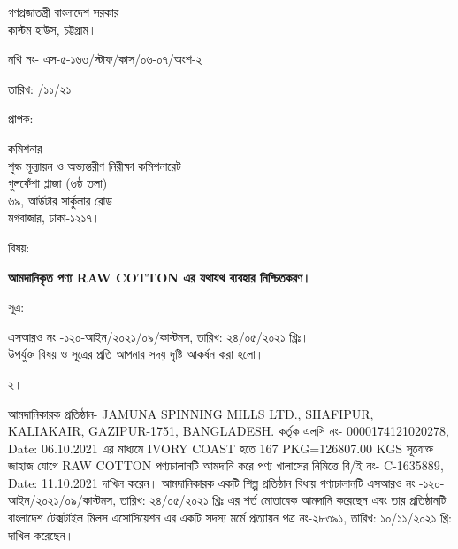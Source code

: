 \documentclass[12pt]{article}
\let\oldhref\href
\renewcommand{\href}[3][blue]{\oldhref{#2}{\color{#1}{#3}}}
\newcommand{\fileno}{নথি নং- এস-৫-১৬৩/স্টাফ/কাস/০৬-০৭/অংশ-২}
\newcommand{\beno}{C-1635889}
\newcommand{\bedt}{11.10.2021}
\newcommand{\co}{IVORY COAST}
\newcommand{\fdt}{\hspace*{3em} তারিখ: \hspace{2.4em} /১১/২১}
\newcommand{\good}{RAW COTTON}
\newcommand{\pkg}{167 PKG=126807.00 KGS}
\newcommand{\lcno}{0000174121020278}
\newcommand{\lcdt}{06.10.2021}
\newcommand{\jsml}{JAMUNA SPINNING MILLS LTD.}
\newcommand{\jsmla}{SHAFIPUR, KALIAKAIR, GAZIPUR-1751, BANGLADESH.}
\newcommand{\srooot}{এসআরও নং -১২০-আইন/২০২১/০৯/কাস্টমস}
\newcommand{\sroootd}{তারিখ: ২৪/০৫/২০২১ খ্রিঃ}
\begin{document}
\begin{center}
\vspace*{0.2\baselineskip}
গণপ্রজাতন্ত্রী বাংলাদেশ সরকার
\\
\footnotesize{কাস্টম হাউস, চট্টগ্রাম।}
\\
\href{}{web: www.chc.gov.bd}\hspace{1em}
\href{}{email: customhousectg@gmail.com}
\end{center}
\begin{minipage}[t]{.74\linewidth}
{\fileno}
\end{minipage}
\begin{minipage}[t]{.26\linewidth}
{\fdt}
\\
\end{minipage}
\begin{minipage}[t]{.07\linewidth}
প্রাপক:
\end{minipage}
\begin{minipage}[t]{.93\linewidth}
কমিশনার
\\
শুল্ক মূল্যায়ন ও অভ্যন্তরীণ নিরীক্ষা কমিশনারেট
\\
গুলফেঁশা প্লাজা (৬ষ্ঠ তলা)
\\
৬৯, আউটার সার্কুলার রোড
\\
মগবাজার, ঢাকা-১২১৭।
\\
\end{minipage}
\begin{minipage}[t]{.07\linewidth}
বিষয়:
\end{minipage}
\begin{minipage}[t]{.93\linewidth}
\textbf{আমদানিকৃত পণ্য {\good} এর যথাযথ ব্যবহার নিশ্চিতকরণ।}
\end{minipage}
\begin{minipage}[t]{.07\linewidth}
সূত্র:
\end{minipage}
\begin{minipage}[t]{.93\linewidth}
{\srooot}, {\sroootd}।
\\
উপর্যুক্ত বিষয় ও সূত্রের প্রতি আপনার সদয় দৃষ্টি
আকর্ষন করা হলো।
\\
\end{minipage}
\begin{minipage}[t]{.07\linewidth}
২।
\end{minipage}
\begin{minipage}[t]{.93\linewidth}
আমদানিকারক প্রতিষ্ঠান- {\jsml}, {\jsmla}
কর্তৃক এলসি নং- {\lcno}, Date: {\lcdt}
এর মাধ্যমে {\co} হতে
{\pkg} সূত্রোক্ত জাহাজ যোগে {\good}
পণ্যচালানটি আমদানি করে পণ্য
খালাসের নিমিত্তে বি/ই নং- {\beno}, Date: {\bedt}
দাখিল করেন। আমদানিকারক একটি
শিল্প প্রতিষ্ঠান বিধায় পণ্যচালানটি
{\srooot}, {\sroootd}
এর শর্ত মোতাবেক আমদানি করেছেন এবং
তার প্রতিষ্ঠানটি বাংলাদেশ টেক্সটাইল মিলস
এসোসিয়েশন এর একটি সদস্য মর্মে প্রত্যায়ন
পত্র নং-২৮৩৯১, তারিখ: ১০/১১/২০২১ খ্রি:
দাখিল করেছেন।
\\
\end{minipage}
\end{document}

